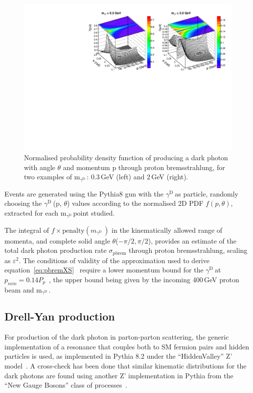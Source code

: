 \documentclass[12pt,a4paper]{article}
\newcommand{\mathDP}{\gamma^{\mathrm{D}}\ }
\newcommand{\DP}{$\mathDP$}
\newcommand{\mDP}{m$_{\mathDP}$}
\begin{document}
\begin{figure}[h!]
  \centering
\includegraphics[width=1.\textwidth]{figures/pbrem_PDF.pdf}
\caption{Normalised probability density function of producing a dark
  photon with angle $\theta$ and momentum p through proton
  bremsstrahlung, for two examples of \mDP: 0.3\,GeV (left) and
  2\,GeV (right).}
\label{fig:pbremPDF}
\end{figure}


Events are generated using the Pythia8 gun with the \DP as particle,
randomly choosing the \DP(p, $\theta$) values according to the
normalised 2D PDF $f(p, \theta)$, extracted for each \mDP point
studied.

The integral of $f\times\mathrm{penalty}(m_{\mathDP})$ in the
kinematically allowed range of momenta, and complete solid angle
$\theta$($-\pi/2,\pi/2$), provides an estimate of the total dark
photon production rate $\sigma_{\mathrm{pbrem}}$ through proton
bremsstrahlung, scaling as $\varepsilon^2$. The conditions of validity
of the approximation used to derive
equation~\ref{eq:pbremXS}~\cite{KIM1972665, Kim_Tsai_1973} require a
lower momentum bound for the \DP at $p_{min}=0.14
P_p$~\cite{Blumlein:2013cua}, the upper bound being given by the
incoming 400\,GeV proton beam and \mDP.


\subsection{Drell-Yan production}
\label{sec:qcd}

For production of the dark photon in parton-parton scattering, the
generic implementation of a resonance that couples both to SM fermion
pairs and hidden particles is used, as implemented in Pythia 8.2 under
the ``HiddenValley'' Z' model~\cite{Carloni:2011kk}. A cross-check
has been done that similar kinematic distributions for the dark
photons are found using another Z' implementation in Pythia from
the ``New Gauge Bosons'' class of processes~\cite{Ciobanu:2005pv}.
\end{document}
